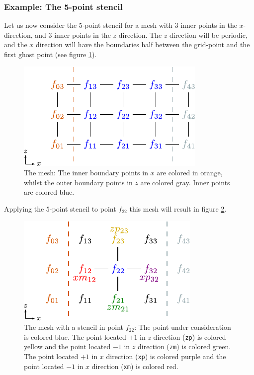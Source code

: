 \documentclass[12pt]{article}
\begin{document}
\subsubsection{Example: The 5-point stencil}
%
Let us now consider the 5-point stencil for a mesh with $3$ inner points in the
$x$-direction, and $3$ inner points in the $z$-direction. The $z$ direction
will be periodic, and the $x$ direction will have the boundaries half between
the grid-point and the first ghost point (see figure \ref{fig:lapl_inv_mesh}).
%
\begin{figure}[htbp!]
    \centering \includegraphics[width=0.3\paperwidth,
    keepaspectratio]{figs/5PointStencilMesh.pdf}
\caption{The mesh: The inner boundary points in $x$ are colored in orange, whilst the
    outer boundary points in $z$ are colored gray. Inner points are colored
blue.}
%
\label{fig:lapl_inv_mesh}
%
\end{figure}
%
Applying the $5$-point stencil to point $f_{22}$ this mesh will result in
figure \ref{fig:lapl_inv_mesh_w_stencil}.
%
\begin{figure}[htbp!]
    \centering \includegraphics[width=0.3\paperwidth,
    keepaspectratio]{figs/5PointStencilMeshWithStencil.pdf}
    \caption{The mesh with a stencil in point $f_{22}$: The point under
        consideration is colored blue. The point located $+1$ in $z$ direction
        (\texttt{zp}) is colored yellow and the point located $-1$ in $z$
        direction (\texttt{zm}) is colored green. The point located $+1$ in $x$
        direction (\texttt{xp}) is colored purple and the point located $-1$ in
    $x$ direction (\texttt{xm}) is colored red.  }
%
\label{fig:lapl_inv_mesh_w_stencil}
%
\end{figure}
\end{document}
